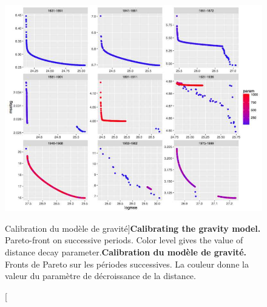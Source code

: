 \begin{figure}
\includegraphics[width=\linewidth]{Figures/Final/4-3-2-fig-interactiongibrat-gravity-pareto}
\caption[Calibrating the gravity model][Calibration du modèle de gravité]{\textbf{Calibrating the gravity model.} Pareto-front on successive periods. Color level gives the value of distance decay parameter.\label{fig:interactiongibrat:gravity-pareto}}{\textbf{Calibration du modèle de gravité.} Fronts de Pareto sur les périodes successives. La couleur donne la valeur du paramètre de décroissance de la distance.\label{fig:interactiongibrat:gravity-pareto}}
\end{figure}


